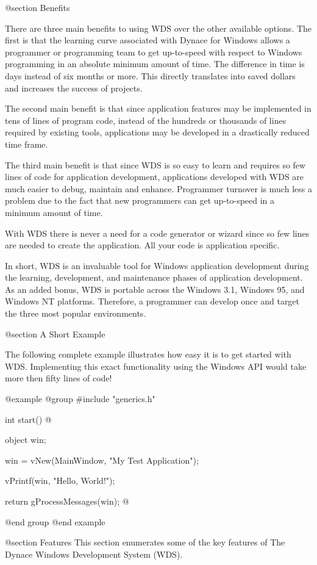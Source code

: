@section Benefits

There are three main benefits to using WDS over the other available
options.  The first is that the learning curve associated with Dynace
for Windows allows a programmer or programming team to get up-to-speed
with respect to Windows programming in an absolute minimum amount of
time.  The difference in time is days instead of six months or more.
This directly translates into saved dollars and increases the success of
projects.

The second main benefit is that since application features may be
implemented in tens of lines of program code, instead of the hundreds or
thousands of lines required by existing tools, applications may be
developed in a drastically reduced time frame.

The third main benefit is that since WDS is so easy to learn and
requires so few lines of code for application development, applications
developed with WDS are much easier to debug, maintain and enhance.
Programmer turnover is much less a problem due to the fact that new
programmers can get up-to-speed in a minimum amount of time.

With WDS there is never a need for a code generator or wizard since
so few lines are needed to create the application.  All your code
is application specific.

In short, WDS is an invaluable tool for Windows application development
during the learning, development, and maintenance phases of application
development.  As an added bonus, WDS is portable across the Windows 3.1,
Windows 95, and Windows NT platforms.  Therefore, a programmer can
develop once and target the three most popular environments.

@section A Short Example

The following complete example illustrates how easy it is to get started
with WDS.  Implementing this exact functionality using the Windows API
would take more then fifty lines of code!

@example
@group
#include "generics.h"

int     start()
@{
        object  win;

        win = vNew(MainWindow, "My Test Application");

        vPrintf(win, "Hello, World!\n");

        return gProcessMessages(win);
@}
@end group
@end example



@section Features
This section enumerates some of the key features of The Dynace Windows
Development System (WDS).

